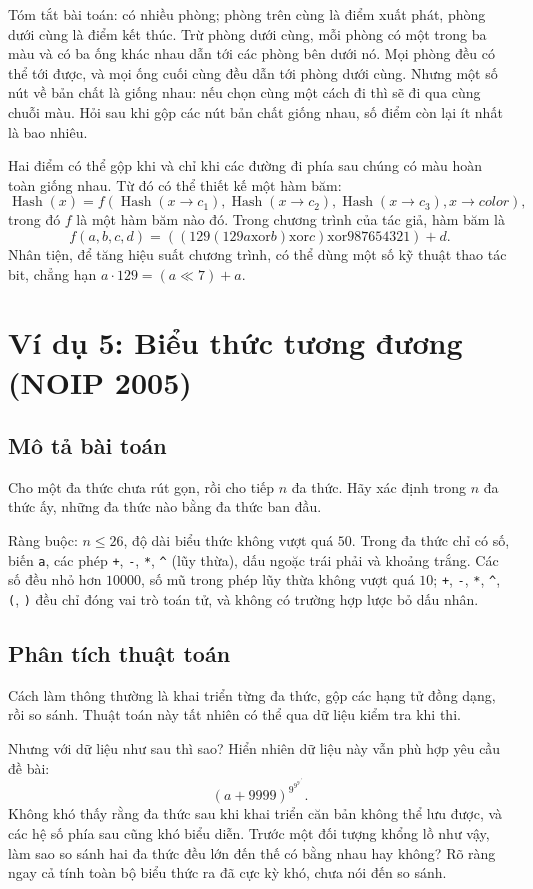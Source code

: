 \documentclass[11pt]{article}
\newcommand{\Hash}{\operatorname{Hash}}
\newcommand{\xor}{\mathbin{\mathrm{xor}}}
\begin{document}
Tóm tắt bài toán: có nhiều phòng; phòng trên cùng là điểm xuất phát, phòng
dưới cùng là điểm kết thúc. Trừ phòng dưới cùng, mỗi phòng có một trong ba
màu và có ba ống khác nhau dẫn tới các phòng bên dưới nó. Mọi phòng đều có
thể tới được, và mọi ống cuối cùng đều dẫn tới phòng dưới cùng. Nhưng một số
nút về bản chất là giống nhau: nếu chọn cùng một cách đi thì sẽ đi qua cùng
chuỗi màu. Hỏi sau khi gộp các nút bản chất giống nhau, số điểm còn lại ít
nhất là bao nhiêu.

Hai điểm có thể gộp khi và chỉ khi các đường đi phía sau chúng có màu hoàn
toàn giống nhau. Từ đó có thể thiết kế một hàm băm:
\[
  \Hash(x)=f(\Hash(x\to c_1),\Hash(x\to c_2),\Hash(x\to c_3),x\to color),
\]
trong đó $f$ là một hàm băm nào đó. Trong chương trình của tác giả, hàm băm
là
\[
  f(a,b,c,d)=((129(129a\xor b)\xor c)\xor 987654321)+d.
\]
Nhân tiện, để tăng hiệu suất chương trình, có thể dùng một số kỹ thuật thao
tác bit, chẳng hạn $a\cdot129=(a\ll 7)+a$.

\section{Ví dụ 5: Biểu thức tương đương (NOIP 2005)}

\subsection{Mô tả bài toán}

Cho một đa thức chưa rút gọn, rồi cho tiếp $n$ đa thức. Hãy xác định trong
$n$ đa thức ấy, những đa thức nào bằng đa thức ban đầu.

Ràng buộc: $n\le 26$, độ dài biểu thức không vượt quá $50$. Trong đa thức chỉ
có số, biến \texttt{a}, các phép \texttt{+}, \texttt{-}, \texttt{*},
\texttt{\^{}} (lũy thừa), dấu ngoặc trái phải và khoảng trắng. Các số đều
nhỏ hơn $10000$, số mũ trong phép lũy thừa không vượt quá $10$;
\texttt{+}, \texttt{-}, \texttt{*}, \texttt{\^{}}, \texttt{(}, \texttt{)}
đều chỉ đóng vai trò toán tử, và không có trường hợp lược bỏ dấu nhân.

\subsection{Phân tích thuật toán}

Cách làm thông thường là khai triển từng đa thức, gộp các hạng tử đồng dạng,
rồi so sánh. Thuật toán này tất nhiên có thể qua dữ liệu kiểm tra khi thi.

Nhưng với dữ liệu như sau thì sao? Hiển nhiên dữ liệu này vẫn phù hợp yêu cầu
đề bài:
\[
  (a+9999)^{9^{9^{9^{\cdot^{\cdot^{9}}}}}}.
\]
Không khó thấy rằng đa thức sau khi khai triển căn bản không thể lưu được,
và các hệ số phía sau cũng khó biểu diễn. Trước một đối tượng khổng lồ như
vậy, làm sao so sánh hai đa thức đều lớn đến thế có bằng nhau hay không? Rõ
ràng ngay cả tính toàn bộ biểu thức ra đã cực kỳ khó, chưa nói đến so sánh.
\end{document}
